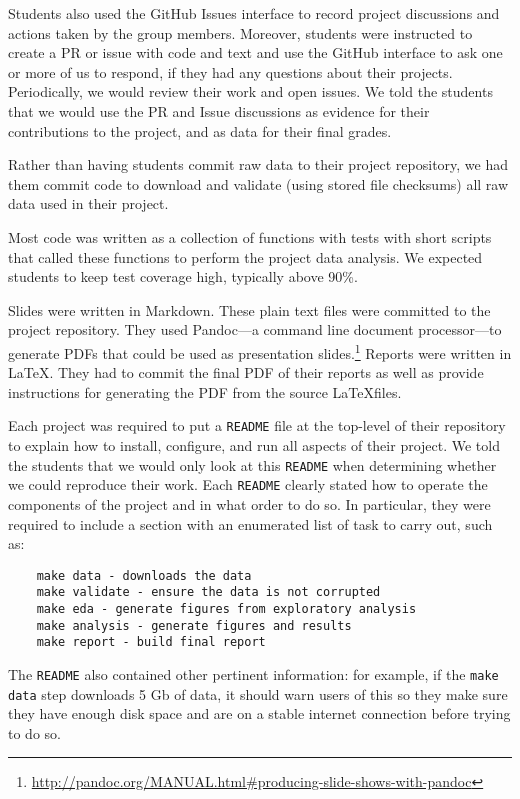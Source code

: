 Students also used the GitHub Issues interface to record project discussions
and actions taken by the group members.
Moreover, students were instructed to create a PR
or issue with code and text and use the GitHub interface to ask one or more
of us to respond, if they had any questions about their projects.
Periodically, we would review their work and open issues.
We told the students that we would use the PR and Issue discussions
as evidence for their contributions to the project, and as data for their
final grades.

Rather than having students commit raw data to their project repository, we had
them commit code to download and validate (using stored file checksums)
all raw data used in their project.

Most code was written as a collection of functions with tests with short
scripts that called these functions to perform the project data analysis.
We expected students to keep test coverage high, typically above 90\%.

Slides were written in Markdown.
These plain text files were committed to the project repository.
They used Pandoc---a command line document processor---to generate
PDFs that could be used as presentation
slides.\footnote{\url{http://pandoc.org/MANUAL.html\#producing-slide-shows-with-pandoc}}
Reports were written in \LaTeX.
They had to commit the final PDF of their reports as well as
provide instructions for generating the PDF from the source
\LaTeX files.

Each project was required to put a \texttt{README} file at the top-level
of their repository to explain how to install, configure,
and run all aspects of their project.
We told the students that we would only look at this \texttt{README}
when determining whether we could reproduce their work.
Each \texttt{README} clearly stated  how to operate the
components of the project and in what order to do so.
In particular, they were required to include a section with
an enumerated list of task to carry out, such as:
\begin{verbatim}
    make data - downloads the data 
    make validate - ensure the data is not corrupted
    make eda - generate figures from exploratory analysis
    make analysis - generate figures and results
    make report - build final report
\end{verbatim}

The \texttt{README} also contained other pertinent information:
for example, if the \texttt{make data} step downloads 5 Gb of data, it should
warn users of this so they make sure they have enough disk space and are on a
stable internet connection before trying to do so.

